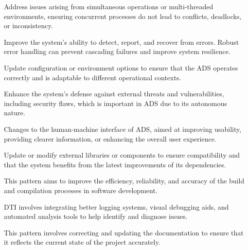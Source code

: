Address issues arising from simultaneous operations or multi-threaded environments, ensuring concurrent processes do not lead to conflicts, deadlocks, or inconsistency.

Improve the system's ability to detect, report, and recover from errors. Robust error handling can prevent cascading failures and improve system resilience.

Update configuration or environment options to ensure that the ADS operates correctly and is adaptable to different operational contexts.

Enhance the system's defense against external threats and vulnerabilities, including security flaws, which is important in ADS due to its autonomous nature.

Changes to the human-machine interface of ADS, aimed at improving usability, providing clearer information, or enhancing the overall user experience.

Update or modify external libraries or components to ensure compatibility and that the system benefits from the latest improvements of its dependencies.

This pattern aims to improve the efficiency, reliability, and accuracy of the build and compilation processes in software development.

DTI involves integrating better logging systems, visual debugging aids, and automated analysis tools to help identify and diagnose issues.

This pattern involves correcting and updating the documentation to ensure that it reflects the current state of the project accurately. 
